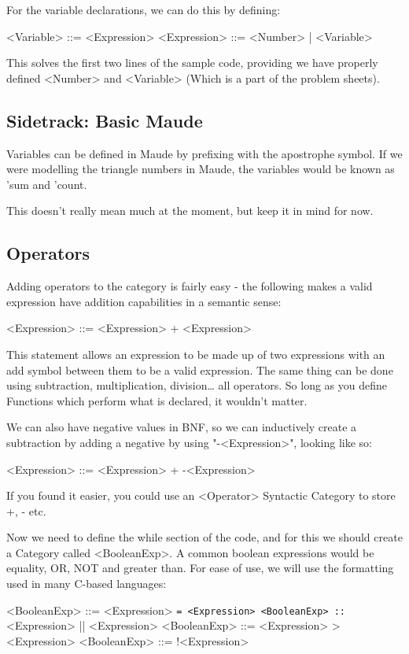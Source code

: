 \documentclass[12pt]{article}
\begin{document}
For the variable declarations, we can do this by defining:

<Variable>   ::= <Expression>
<Expression> ::= <Number> | <Variable>

This solves the first two lines of the sample code, providing we have properly
defined <Number> and <Variable> (Which is a part of the problem sheets).

\subsection{Sidetrack: Basic Maude}
\label{sec-3-3}
Variables can be defined in Maude by prefixing with the apostrophe symbol.
If we were modelling the triangle numbers in Maude, the variables would be
known as 'sum and 'count.

This doesn't really mean much at the moment, but keep it in mind for now.

\subsection{Operators}
\label{sec-3-4}

Adding operators to the category is fairly easy - the following makes a valid
expression have addition capabilities in a semantic sense:

<Expression> ::= <Expression> + <Expression>

This statement allows an expression to be made up of two expressions with an
add symbol between them to be a valid expression.  The same thing can be done
using subtraction, multiplication, division\ldots{} all operators.  So long as you
define Functions which perform what is declared, it wouldn't matter.

We can also have negative values in BNF, so we can inductively create a
subtraction by adding a negative by using "-<Expression>", looking like so:

<Expression> ::= <Expression> + -<Expression>

If you found it easier, you could use an <Operator> Syntactic Category to store
+, - etc.

Now we need to define the while section of the code, and for this we should
create a Category called <BooleanExp>.  A common boolean expressions would be
equality, OR, NOT and greater than.  For ease of use, we will use the
formatting used in many C-based languages:

<BooleanExp> ::= <Expression> \texttt{= <Expression>
<BooleanExp> ::} <Expression> || <Expression>
<BooleanExp> ::= <Expression> >  <Expression>
<BooleanExp> ::= !<Expression>
\end{document}
